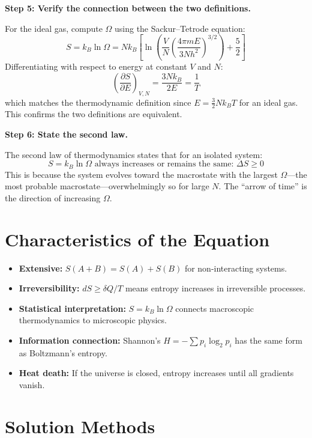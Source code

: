 \textbf{Step 5: Verify the connection between the two definitions.}

For the ideal gas, compute $\Omega$ using the Sackur--Tetrode equation:
\begin{equation}
S = k_B\ln\Omega = Nk_B\left[\ln\left(\frac{V}{N}\left(\frac{4\pi m E}{3Nh^2}\right)^{3/2}\right) + \frac{5}{2}\right]
\end{equation}
Differentiating with respect to energy at constant $V$ and $N$:
\begin{equation}
\left(\frac{\partial S}{\partial E}\right)_{V,N} = \frac{3Nk_B}{2E} = \frac{1}{T}
\end{equation}
which matches the thermodynamic definition since $E = \frac{3}{2}Nk_BT$ for an ideal gas. This confirms the two definitions are equivalent.

\textbf{Step 6: State the second law.}

The second law of thermodynamics states that for an isolated system:
\begin{equation}
\boxed{S = k_B\ln\Omega \text{ always increases or remains the same: } \Delta S \geq 0}
\end{equation}
This is because the system evolves toward the macrostate with the largest $\Omega$---the most probable macrostate---overwhelmingly so for large $N$. The ``arrow of time'' is the direction of increasing $\Omega$.

\section*{Characteristics of the Equation}

\begin{itemize}
\item \textbf{Extensive:} $S(A + B) = S(A) + S(B)$ for non-interacting systems.
\item \textbf{Irreversibility:} $dS \geq \delta Q/T$ means entropy increases in irreversible processes.
\item \textbf{Statistical interpretation:} $S = k_B \ln \Omega$ connects macroscopic thermodynamics to microscopic physics.
\item \textbf{Information connection:} Shannon's $H = -\sum p_i \log_2 p_i$ has the same form as Boltzmann's entropy.
\item \textbf{Heat death:} If the universe is closed, entropy increases until all gradients vanish.
\end{itemize}
\section*{Solution Methods}


